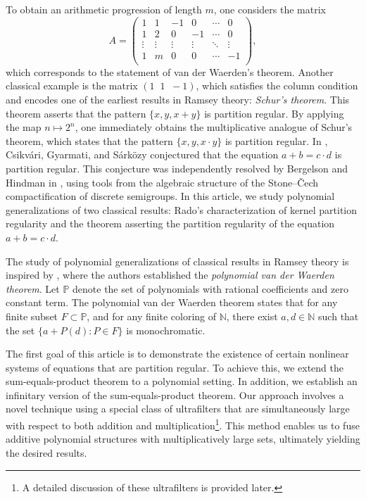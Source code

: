 \documentclass{article}
\theoremstyle{Theorem}
\theoremstyle{definition}
\begin{document}
To obtain an arithmetic progression of length \( m \), one considers the matrix
\[
A =
\begin{pmatrix}
    1 & 1 & -1 & 0 & \cdots & 0 \\
    1 & 2 & 0 & -1 & \cdots & 0 \\
    \vdots & \vdots & \vdots & \vdots & \ddots & \vdots \\
    1 & m & 0 & 0 & \cdots & -1 \\
\end{pmatrix},
\]
which corresponds to the statement of van der Waerden’s theorem. Another classical example is the matrix \( (1 \;\; 1 \;\; -1) \), which satisfies the column condition and encodes one of the earliest results in Ramsey theory: \emph{Schur's theorem}\cite{schur}. This theorem asserts that the pattern \( \{x, y, x + y\} \) is partition regular. By applying the map \( n \mapsto 2^n \), one immediately obtains the multiplicative analogue of Schur's theorem, which states that the pattern \( \{x, y, x \cdot y\} \) is partition regular. In \cite{comb}, Csikvári, Gyarmati, and Sárközy conjectured that the equation \( a + b = c \cdot d \) is partition regular. This conjecture was independently resolved by Bergelson and Hindman in \cite{pissa, h2}, using tools from the algebraic structure of the Stone–Čech compactification of discrete semigroups. In this article, we study polynomial generalizations of two classical results: Rado’s characterization of kernel partition regularity and the theorem asserting the partition regularity of the equation \( a + b = c \cdot d \).


The study of polynomial generalizations of classical results in Ramsey theory is inspired by \cite{2, 30}, where the authors established the \emph{polynomial van der Waerden theorem}. Let \( \mathbb{P} \) denote the set of polynomials with rational coefficients and zero constant term. The polynomial van der Waerden theorem states that for any finite subset \( F \subset \mathbb{P} \), and for any finite coloring of \( \mathbb{N} \), there exist \( a, d \in \mathbb{N} \) such that the set \( \{ a + P(d) : P \in F \} \) is monochromatic.

\medskip

The first goal of this article is to demonstrate the existence of certain nonlinear systems of equations that are partition regular. To achieve this, we extend the sum-equals-product theorem to a polynomial setting. In addition, we establish an infinitary version of the sum-equals-product theorem.
 Our approach involves a novel technique using a special class of ultrafilters that are simultaneously large with respect to both addition and multiplication\footnote{A detailed discussion of these ultrafilters is provided later.}. This method enables us to fuse additive polynomial structures with multiplicatively large sets, ultimately yielding the desired results.
\end{document}
